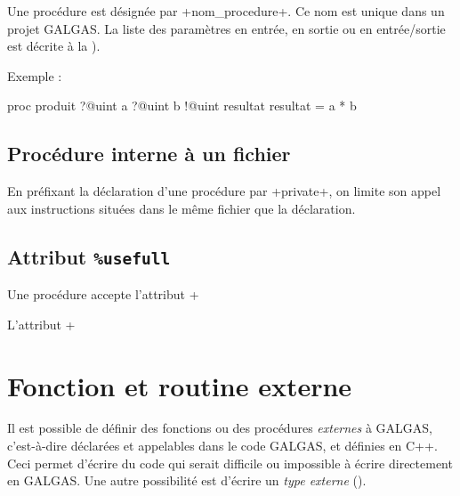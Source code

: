 Une procédure est désignée par \ggs+nom_procedure+. Ce nom est unique dans un projet GALGAS. La liste des paramètres en entrée, en sortie ou en entrée/sortie est décrite à la ).

Exemple :

\begin{galgas}
proc produit ?@uint a ?@uint b !@uint resultat {
  resultat = a * b
}
\end{galgas}



\subsection{Procédure interne à un fichier}

En préfixant la déclaration d'une procédure par \ggs+private+, on limite son appel aux instructions situées dans le même fichier que la déclaration.


\subsection{Attribut \texttt{\%usefull}}

Une procédure accepte l'attribut \ggs+%


L'attribut \ggs+%




\section{Fonction et routine externe}

Il est possible de définir des fonctions ou des procédures \emph{externes} à GALGAS, c'est-à-dire déclarées et appelables dans le code GALGAS, et définies en C++. Ceci permet d'écrire du code qui serait difficile ou impossible à écrire directement en GALGAS. Une autre possibilité est d'écrire un \emph{type externe} ().

